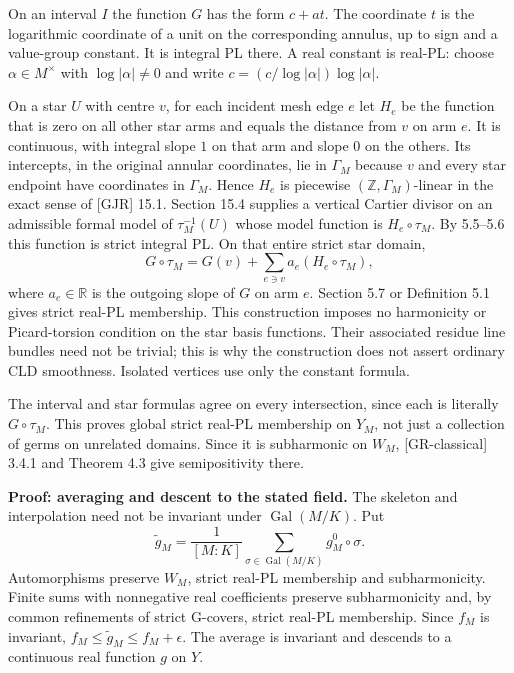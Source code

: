 \documentclass[
  11pt,
]{article}
\begin{document}
On an interval \(I\) the function \(G\) has the form \(c+a t\). The
coordinate \(t\) is the logarithmic coordinate of a unit on the
corresponding annulus, up to sign and a value-group constant. It is
integral PL there. A real constant is real-PL: choose
\(\alpha\in M^\times\) with \(\log|\alpha|\ne0\) and write
\(c=(c/\log|\alpha|)\log|\alpha|\).

On a star \(U\) with centre \(v\), for each incident mesh edge \(e\) let
\(H_e\) be the function that is zero on all other star arms and equals
the distance from \(v\) on arm \(e\). It is continuous, with integral
slope \(1\) on that arm and slope \(0\) on the others. Its intercepts,
in the original annular coordinates, lie in \(\Gamma_M\) because \(v\)
and every star endpoint have coordinates in \(\Gamma_M\). Hence \(H_e\)
is piecewise \((\mathbb Z,\Gamma_M)\)-linear in the exact sense of
{[}GJR{]} 15.1. Section 15.4 supplies a vertical Cartier divisor on an
admissible formal model of \(\tau_M^{-1}(U)\) whose model function is
\(H_e\circ\tau_M\). By 5.5--5.6 this function is strict integral PL. On
that entire strict star domain,
\[G\circ\tau_M=G(v)+\sum_{e\ni v}a_e(H_e\circ\tau_M),\] where
\(a_e\in\mathbb R\) is the outgoing slope of \(G\) on arm \(e\). Section
5.7 or Definition 5.1 gives strict real-PL membership. This construction
imposes no harmonicity or Picard-torsion condition on the star basis
functions. Their associated residue line bundles need not be trivial;
this is why the construction does not assert ordinary CLD smoothness.
Isolated vertices use only the constant formula.

The interval and star formulas agree on every intersection, since each
is literally \(G\circ\tau_M\). This proves global strict real-PL
membership on \(Y_M\), not just a collection of germs on unrelated
domains. Since it is subharmonic on \(W_M\), {[}GR-classical{]} 3.4.1
and Theorem 4.3 give semipositivity there.

\textbf{Proof: averaging and descent to the stated field.} The skeleton
and interpolation need not be invariant under
\(\operatorname{Gal}(M/K)\). Put
\[\widetilde g_M=\frac1{[M:K]}\sum_{\sigma\in\operatorname{Gal}(M/K)}g_M^0\circ\sigma.\]
Automorphisms preserve \(W_M\), strict real-PL membership and
subharmonicity. Finite sums with nonnegative real coefficients preserve
subharmonicity and, by common refinements of strict G-covers, strict
real-PL membership. Since \(f_M\) is invariant,
\(f_M\le\widetilde g_M\le f_M+\epsilon\). The average is invariant and
descends to a continuous real function \(g\) on \(Y\).
\end{document}
